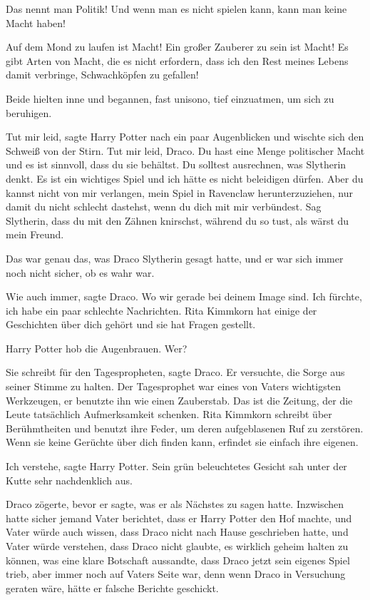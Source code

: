 \glqq{}Das nennt man Politik! Und wenn man es nicht spielen kann, kann man keine
Macht haben!\grqq{}

\glqq{}Auf dem Mond zu laufen ist Macht! Ein großer Zauberer zu sein ist Macht!
Es gibt Arten von Macht, die es nicht erfordern, dass ich den Rest meines Lebens
damit verbringe, Schwachköpfen zu gefallen!\grqq{}

Beide hielten inne und begannen, fast unisono, tief einzuatmen, um sich zu
beruhigen.

\glqq{}Tut mir leid\grqq{}, sagte Harry Potter nach ein paar Augenblicken und
wischte sich den Schweiß von der Stirn. \glqq{}Tut mir leid, Draco. Du hast eine
Menge politischer Macht und es ist sinnvoll, dass du sie behältst. Du solltest
ausrechnen, was Slytherin denkt. Es ist ein wichtiges Spiel und ich hätte es
nicht beleidigen dürfen. Aber du kannst nicht von mir verlangen, mein Spiel in
Ravenclaw herunterzuziehen, nur damit du nicht schlecht dastehst, wenn du dich
mit mir verbündest. Sag Slytherin, dass du mit den Zähnen knirschst, während du
so tust, als wärst du mein Freund.\grqq{}

Das war genau das, was Draco Slytherin gesagt hatte, und er war sich immer noch
nicht sicher, ob es wahr war.

\glqq{}Wie auch immer\grqq{}, sagte Draco. \glqq{}Wo wir gerade bei deinem Image
sind. Ich fürchte, ich habe ein paar schlechte Nachrichten. Rita Kimmkorn hat
einige der Geschichten über dich gehört und sie hat Fragen gestellt.\grqq{}

Harry Potter hob die Augenbrauen. \glqq{}Wer?\grqq{}

\glqq{}Sie schreibt für den Tagespropheten\grqq{}, sagte Draco. Er versuchte, die
Sorge aus seiner Stimme zu halten. Der Tagesprophet war eines von Vaters
wichtigsten Werkzeugen, er benutzte ihn wie einen Zauberstab. \glqq{}Das ist die
Zeitung, der die Leute tatsächlich Aufmerksamkeit schenken. Rita Kimmkorn
schreibt über Berühmtheiten und benutzt ihre Feder, um deren aufgeblasenen Ruf
zu zerstören. Wenn sie keine Gerüchte über dich finden kann, erfindet sie
einfach ihre eigenen.\grqq{}

\glqq{}Ich verstehe\grqq{}, sagte Harry Potter. Sein grün beleuchtetes Gesicht
sah unter der Kutte sehr nachdenklich aus.

Draco zögerte, bevor er sagte, was er als Nächstes zu sagen hatte. Inzwischen
hatte sicher jemand Vater berichtet, dass er Harry Potter den Hof machte, und
Vater würde auch wissen, dass Draco nicht nach Hause geschrieben hatte, und
Vater würde verstehen, dass Draco nicht glaubte, es wirklich geheim halten zu
können, was eine klare Botschaft aussandte, dass Draco jetzt sein eigenes Spiel
trieb, aber immer noch auf Vaters Seite war, denn wenn Draco in Versuchung
geraten wäre, hätte er falsche Berichte geschickt.

